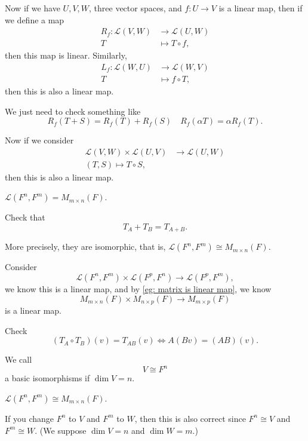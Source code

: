 Now if we have \(U,V,W\), three vector spaces, and \(f: U \to V\) is a linear map, then if we define a map 
\begin{align*}
    R_f: \mathcal{L} (V, W) &\to \mathcal{L} (U, W) \\
    T &\mapsto T \circ f,
\end{align*} 
then this map is linear. Similarly,
\begin{align*}
    L_f: \mathcal{L} (W, U) &\to \mathcal{L} (W, V) \\
    T &\mapsto f \circ T,
\end{align*}
then this is also a linear map.
\begin{note}
    We just need to check something like 
    \[
        R_f(T+S) = R_f(T) + R_f(S) \quad R_f(\alpha T) = \alpha R_f(T).
    \]
\end{note}
Now if we consider 
\begin{align*}
    \mathcal{L} (V, W) \times \mathcal{L} (U, V) &\to \mathcal{L} (U, W) \\
    (T, S) \mapsto T \circ S,
\end{align*}
then this is also a linear map.

\begin{eg} \label{eg: matrix is linear map}
    \(\mathcal{L} (F^n, F^m) = M_{m \times n}(F)\). 
    
\end{eg}
\begin{explanation}
    Check that 
    \[
        T_A + T_B = T_{A + B}.
    \]
        \begin{note}
        More precisely, they are isomorphic, that is, \(\mathcal{L} (F^n, F^m) \cong M_{m \times n}(F)\). 
    \end{note}
\end{explanation}

\begin{eg}
    Consider 
    \[
        \mathcal{L}(F^n, F^m) \times \mathcal{L} (F^p, F^n) \to \mathcal{L} (F^p, F^m),
    \] we know this is a linear map, and by \autoref{eg: matrix is linear map}, we know 
    \[
        M_{m \times n}(F) \times M_{n \times p}(F) \to M_{m \times p}(F)
    \] is a linear map.
\end{eg}
\begin{explanation}
    Check 
    \[
        (T_A \circ T_B)(v) = T_{AB}(v) \iff A(Bv) = (AB)(v).
    \]
\end{explanation}

\begin{definition}
    We call 
    \[
        V \cong F^n
    \] a basic isomorphisms if \(\dim V = n\). 
\end{definition}

\begin{corollary}
    \(\mathcal{L} (F^n, F^m) \cong M_{m \times n}(F)\). 
\end{corollary}
\begin{remark}
    If you change \(F^n\) to \(V\) and \(F^m\) to \(W\), then this is also correct since \(F^n \cong V\) and \(F^m \cong W\). (We suppose \(\dim V = n\) and \(\dim W = m\).)      
\end{remark}